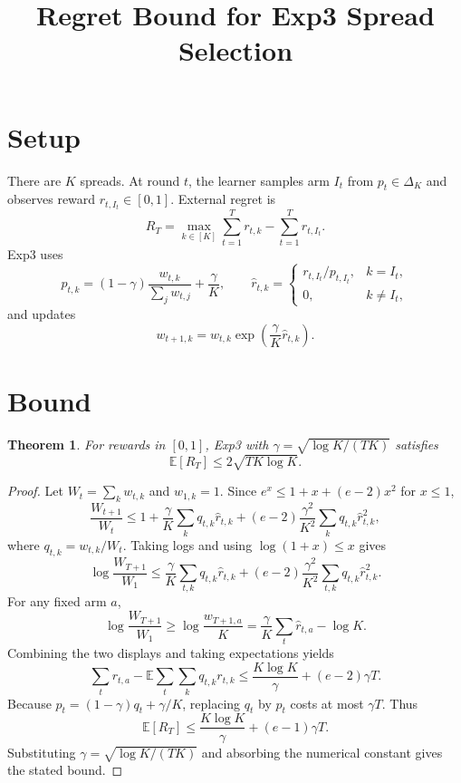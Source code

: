 \documentclass[11pt]{article}
\title{Regret Bound for Exp3 Spread Selection}
\author{}
\date{}
\newtheorem{theorem}{Theorem}
\begin{document}
\maketitle

\section{Setup}
There are $K$ spreads. At round $t$, the learner samples arm $I_t$ from
$p_t \in \Delta_K$ and observes reward $r_{t,I_t}\in[0,1]$. External regret is
\[
R_T = \max_{k\in[K]}\sum_{t=1}^T r_{t,k}
      - \sum_{t=1}^T r_{t,I_t}.
\]
Exp3 uses
\[
p_{t,k} = (1-\gamma)\frac{w_{t,k}}{\sum_j w_{t,j}}+\frac{\gamma}{K},
\qquad
\widehat r_{t,k} =
\begin{cases}
r_{t,I_t}/p_{t,I_t}, & k=I_t,\\
0, & k\ne I_t,
\end{cases}
\]
and updates
\[
w_{t+1,k}=w_{t,k}\exp\left(\frac{\gamma}{K}\widehat r_{t,k}\right).
\]

\section{Bound}
\begin{theorem}
For rewards in $[0,1]$, Exp3 with
$\gamma=\sqrt{\log K/(TK)}$ satisfies
\[
\mathbb{E}[R_T] \le 2\sqrt{TK\log K}.
\]
\end{theorem}

\begin{proof}
Let $W_t=\sum_k w_{t,k}$ and $w_{1,k}=1$. Since
$e^x\le 1+x+(e-2)x^2$ for $x\le 1$,
\[
\frac{W_{t+1}}{W_t}
\le
1+\frac{\gamma}{K}\sum_k q_{t,k}\widehat r_{t,k}
  +(e-2)\frac{\gamma^2}{K^2}\sum_k q_{t,k}\widehat r_{t,k}^2,
\]
where $q_{t,k}=w_{t,k}/W_t$. Taking logs and using $\log(1+x)\le x$ gives
\[
\log\frac{W_{T+1}}{W_1}
\le
\frac{\gamma}{K}\sum_{t,k}q_{t,k}\widehat r_{t,k}
+(e-2)\frac{\gamma^2}{K^2}\sum_{t,k}q_{t,k}\widehat r_{t,k}^2.
\]
For any fixed arm $a$,
\[
\log\frac{W_{T+1}}{W_1}
\ge
\log\frac{w_{T+1,a}}{K}
=
\frac{\gamma}{K}\sum_t \widehat r_{t,a}-\log K.
\]
Combining the two displays and taking expectations yields
\[
\sum_t r_{t,a}
- \mathbb{E}\sum_t\sum_k q_{t,k}r_{t,k}
\le
\frac{K\log K}{\gamma}+(e-2)\gamma T.
\]
Because $p_t=(1-\gamma)q_t+\gamma/K$, replacing $q_t$ by $p_t$ costs at most
$\gamma T$. Thus
\[
\mathbb{E}[R_T]\le \frac{K\log K}{\gamma}+(e-1)\gamma T.
\]
Substituting $\gamma=\sqrt{\log K/(TK)}$ and absorbing the numerical constant
gives the stated bound.
\end{proof}
\end{document}
